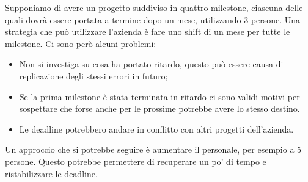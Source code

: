 Supponiamo di avere un progetto suddiviso in quattro milestone, ciascuna delle quali dovrà essere portata a termine dopo un mese, utilizzando 3 persone. Una strategia che può utilizzare l'azienda è fare uno shift di un mese per tutte le milestone. Ci sono però alcuni problemi:
\begin{itemize}
	\item Non si investiga su cosa ha portato ritardo, questo può essere causa di replicazione degli stessi errori in futuro;
	\item Se la prima milestone è stata terminata in ritardo ci sono validi motivi per sospettare che forse anche per le prossime potrebbe avere lo stesso destino.
	\item Le deadline potrebbero andare in conflitto con altri progetti dell'azienda.
\end{itemize}
Un approccio che si potrebbe seguire è aumentare il personale, per esempio a 5 persone. Questo potrebbe permettere di recuperare un po' di tempo e ristabilizzare le deadline.

